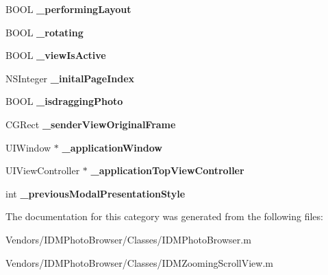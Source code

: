 \begin{DoxyCompactItemize}
\item 
\hypertarget{category_i_d_m_photo_browser_07_08_ac127de9ca55f4485eb1e50459658a9fd}{}B\+O\+O\+L {\bfseries \+\_\+performing\+Layout}\label{category_i_d_m_photo_browser_07_08_ac127de9ca55f4485eb1e50459658a9fd}

\item 
\hypertarget{category_i_d_m_photo_browser_07_08_a8269c377a44c891b9da4a9aa738257a9}{}B\+O\+O\+L {\bfseries \+\_\+rotating}\label{category_i_d_m_photo_browser_07_08_a8269c377a44c891b9da4a9aa738257a9}

\item 
\hypertarget{category_i_d_m_photo_browser_07_08_a3d02895ddba298881d2e6e7fab08dccb}{}B\+O\+O\+L {\bfseries \+\_\+view\+Is\+Active}\label{category_i_d_m_photo_browser_07_08_a3d02895ddba298881d2e6e7fab08dccb}

\item 
\hypertarget{category_i_d_m_photo_browser_07_08_afcadb35937c107d2106d936eeb261fd6}{}N\+S\+Integer {\bfseries \+\_\+inital\+Page\+Index}\label{category_i_d_m_photo_browser_07_08_afcadb35937c107d2106d936eeb261fd6}

\item 
\hypertarget{category_i_d_m_photo_browser_07_08_aeae88005608ed5f84c3a39eb6f06e01c}{}B\+O\+O\+L {\bfseries \+\_\+isdragging\+Photo}\label{category_i_d_m_photo_browser_07_08_aeae88005608ed5f84c3a39eb6f06e01c}

\item 
\hypertarget{category_i_d_m_photo_browser_07_08_ab097c208101be3181f489ed32d5eeabf}{}C\+G\+Rect {\bfseries \+\_\+sender\+View\+Original\+Frame}\label{category_i_d_m_photo_browser_07_08_ab097c208101be3181f489ed32d5eeabf}

\item 
\hypertarget{category_i_d_m_photo_browser_07_08_a419ab9226065320dcae874183e3048ae}{}U\+I\+Window $\ast$ {\bfseries \+\_\+application\+Window}\label{category_i_d_m_photo_browser_07_08_a419ab9226065320dcae874183e3048ae}

\item 
\hypertarget{category_i_d_m_photo_browser_07_08_ad1411fb0d134667f9f8009848331b682}{}U\+I\+View\+Controller $\ast$ {\bfseries \+\_\+application\+Top\+View\+Controller}\label{category_i_d_m_photo_browser_07_08_ad1411fb0d134667f9f8009848331b682}

\item 
\hypertarget{category_i_d_m_photo_browser_07_08_a368ef805d0c697ca943bbea5fdd6cb99}{}int {\bfseries \+\_\+previous\+Modal\+Presentation\+Style}\label{category_i_d_m_photo_browser_07_08_a368ef805d0c697ca943bbea5fdd6cb99}

\end{DoxyCompactItemize}


The documentation for this category was generated from the following files\+:\begin{DoxyCompactItemize}
\item 
Vendors/\+I\+D\+M\+Photo\+Browser/\+Classes/I\+D\+M\+Photo\+Browser.\+m\item 
Vendors/\+I\+D\+M\+Photo\+Browser/\+Classes/I\+D\+M\+Zooming\+Scroll\+View.\+m\end{DoxyCompactItemize}
